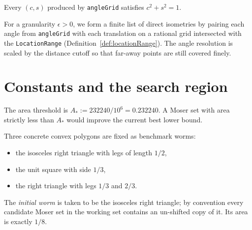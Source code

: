 \begin{lemma}
  \label{lem:angleGrid-spec}
  \leanok
  Every $(c, s)$ produced by \texttt{angleGrid} satisfies $c^2 + s^2 = 1$.
\end{lemma}

\begin{definition}
  \label{def:discretizeIsometries}
  \leanok
  For a granularity $\epsilon > 0$, we form a finite list of direct
  isometries by pairing each angle from \texttt{angleGrid} with each
  translation on a rational grid intersected with the
  \texttt{LocationRange} (Definition~\ref{def:locationRange}). The angle
  resolution is scaled by the distance cutoff so that far-away points are
  still covered finely.
\end{definition}

\chapter{Constants and the search region}

\begin{definition}
  \label{def:areaThreshold}
  \leanok
  The area threshold is $A_* := 232240 / 10^6 = 0.232240$. A Moser set
  with area strictly less than $A_*$ would improve the current best lower
  bound.
\end{definition}

\begin{definition}
  \label{def:benchmark-worms}
  \leanok
  Three concrete convex polygons are fixed as benchmark worms:
  \begin{itemize}
    \item the isosceles right triangle with legs of length $1/2$,
    \item the unit square with side $1/3$,
    \item the right triangle with legs $1/3$ and $2/3$.
  \end{itemize}
  The \emph{initial worm} is taken to be the isosceles right triangle; by
  convention every candidate Moser set in the working set contains an
  un-shifted copy of it. Its area is exactly $1/8$.
\end{definition}

